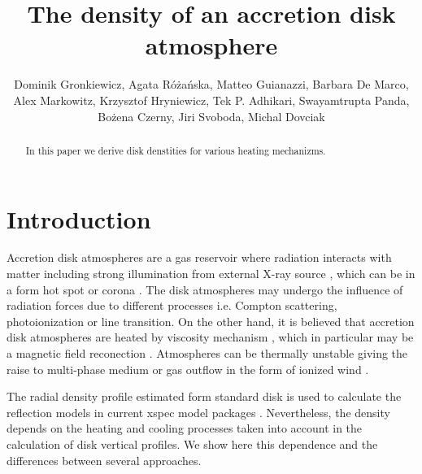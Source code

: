 \documentclass[preprint2]{aastex6}
\begin{document}
\title{The density of an accretion disk atmosphere}

\author{Dominik Gronkiewicz, Agata R\'o\.za\'nska, 
Matteo Guianazzi, Barbara De Marco, Alex Markowitz, Krzysztof Hryniewicz, Tek P. Adhikari, Swayamtrupta Panda, Bo\.zena Czerny, 
 Jiri Svoboda, Michal Dovciak
}


\begin{abstract}

In this paper we derive disk denstities for various heating mechanizms. 
\end{abstract}


\section{Introduction}

Accretion disk atmospheres are a gas reservoir where radiation interacts with matter including 
strong illumination from external X-ray source \citep{1990-Pounds}, which can be in a form 
hot spot or corona \citep{1977-Liang,1978-Paczynski}. The disk atmospheres may undergo the influence of radiation forces due to different processes i.e. Compton scattering, photoionization or line transition. On the other hand, 
it is believed that accretion disk atmospheres are heated by viscosity mechanism 
\citep{1973-ShakuraSunyaev}, 
which in particular may be a magnetic field reconection \citep{1992-ToutPringle,1999-BalbusPapaloizou}. Atmospheres can be thermally unstable giving the raise to multi-phase medium \citep{krolik1981,1994-KusunoseMineshige,1993-NakamuraOsaki,1996-RozanskaCzerny,1999-Rozanska} or gas outflow in the form of 
ionized wind \citep{1997-Reynolds,1999-Crenshaw}.

The radial density profile estimated form standard disk \citep{1973-ShakuraSunyaev} is used
to calculate the reflection models in current {\sc xspec} model packages \citep{}. Nevertheless, 
the density depends on the heating and cooling processes taken into account in the 
calculation of disk vertical profiles. We show here this dependence and the differences 
between several approaches. 
\end{document}
